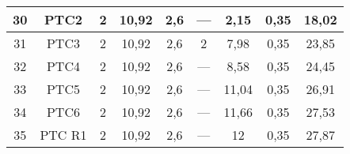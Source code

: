 \begin{table}[h!]
\begin{tabular}{|c|c|c|c|c|c|c|c|c|}
	30                 & PTC2               & 2                                                    & 10,92                                       & 2,6                                           & ---                                           & 2,15                                             & 0,35                                            & 18,02                                                             \\ \hline
	31                 & PTC3               & 2                                                    & 10,92                                       & 2,6                                           & 2                                             & 7,98                                             & 0,35                                            & 23,85                                                             \\ \hline
	32                 & PTC4               & 2                                                    & 10,92                                       & 2,6                                           & ---                                           & 8,58                                             & 0,35                                            & 24,45                                                             \\ \hline
	33                 & PTC5               & 2                                                    & 10,92                                       & 2,6                                           & ---                                           & 11,04                                            & 0,35                                            & 26,91                                                             \\ \hline
	34                 & PTC6               & 2                                                    & 10,92                                       & 2,6                                           & ---                                           & 11,66                                            & 0,35                                            & 27,53                                                             \\ \hline
	35                 & PTC R1             & 2                                                    & 10,92                                       & 2,6                                           & ---                                           & 12                                               & 0,35                                            & 27,87                                                             \\ \hline

\end{tabular}
\end{table}
